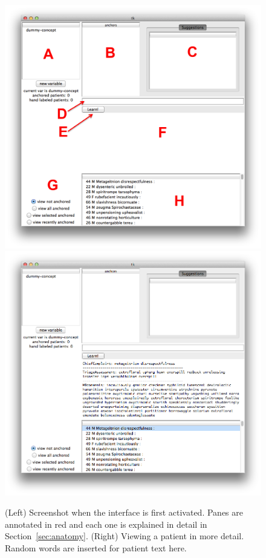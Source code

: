 \documentclass[12pt]{article}
\begin{document}
\begin{figure}[tb]
    \begin{center}
        \includegraphics[scale=0.40]{screen_2_annotated.png}
        \includegraphics[scale=0.25]{screen_3.png}
    \end{center}
    \caption{\label{fig:first_activation} (Left) Screenshot when the interface is first activated. Panes are annotated in red and each one is explained in detail in Section~\ref{sec:anatomy}. (Right) Viewing a patient in more detail. Random words are inserted for patient text here.}
\end{figure}
\end{document}
